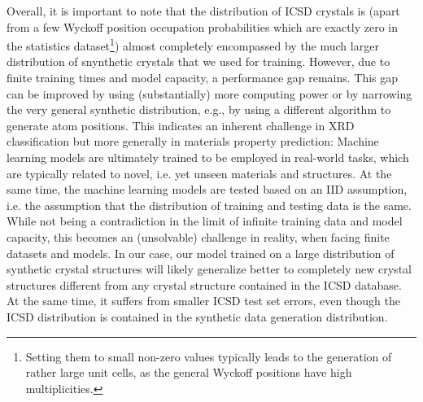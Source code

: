     Overall, it is important to note that the distribution of ICSD crystals is (apart from a few Wyckoff position occupation probabilities which are exactly zero in the statistics dataset\footnote{Setting them to small non-zero values typically leads to the generation of rather large unit cells, as the general Wyckoff positions have high multiplicities.}) almost completely encompassed by the much larger distribution of snynthetic crystals that we used for training.
    However, due to finite training times and model capacity, a performance gap remains. This gap can be improved by using (substantially) more computing power or by narrowing the very general synthetic distribution, e.g., by using a different algorithm to generate atom positions.
    This indicates an inherent challenge in XRD classification but more generally in materials property prediction:
    Machine learning models are ultimately trained to be employed in real-world tasks, which are typically related to novel, i.e. yet unseen materials and structures.
    At the same time, the machine learning models are tested based on an IID assumption, i.e. the assumption that the distribution of training and testing data is the same.
    While not being a contradiction in the limit of infinite training data and model capacity, this becomes an (unsolvable) challenge in reality, when facing finite datasets and models.
    In our case, our model trained on a large distribution of synthetic crystal structures will likely generalize better to completely new crystal structures different from any crystal structure contained in the ICSD database.
    At the same time, it suffers from smaller ICSD test set errors, even though the ICSD distribution is contained in the synthetic data generation distribution.